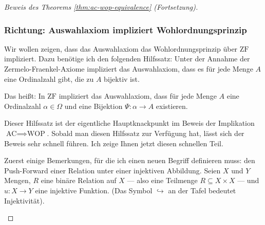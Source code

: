 \begin{proof}[Beweis des Theorems \ref{thm:ac-wop-equivalence} (Fortsetzung)]

\subsubsection{Richtung: Auswahlaxiom impliziert Wohlordnungsprinzip}

\begin{spoken-clean}[00:57:26 - 00:58:40]
Wir wollen zeigen, dass das Auswahlaxiom das Wohlordnungsprinzip über $\text{ZF}$ impliziert. Dazu benötige ich den folgenden Hilfssatz: Unter der Annahme der Zermelo-Fraenkel-Axiome impliziert das Auswahlaxiom, dass es für jede Menge $A$ eine Ordinalzahl gibt, die zu $A$ bijektiv ist.

Das heißt: In $\text{ZF}$ impliziert das Auswahlaxiom, dass für jede Menge $A$ eine Ordinalzahl $\alpha \in \Omega$ und eine Bijektion $\Psi \colon \alpha \to A$ existieren.
\end{spoken-clean}

\begin{math-stroke}
\end{math-stroke}

\begin{spoken-clean}[00:58:40 - 01:00:00]
Dieser Hilfssatz ist der eigentliche Hauptknackpunkt im Beweis der Implikation $\text{AC} \implies \text{WOP}$. Sobald man diesen Hilfssatz zur Verfügung hat, lässt sich der Beweis sehr schnell führen. Ich zeige Ihnen jetzt diesen schnellen Teil.

Zuerst einige Bemerkungen, für die ich einen neuen Begriff definieren muss: den Push-Forward einer Relation unter einer injektiven Abbildung. Seien $X$ und $Y$ Mengen, $R$ eine binäre Relation auf $X$ --- also eine Teilmenge $R \subseteq X \times X$ --- und $u \colon X \to Y$ eine injektive Funktion. (Das Symbol $\hookrightarrow$ an der Tafel bedeutet Injektivität).
\end{spoken-clean}

\begin{math-stroke}
\end{math-stroke}


\end{proof}
